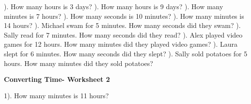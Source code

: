 \documentclass{article}%
\begin{document}
). How many hours is 3 days?%
\newline%
\newline%
). How many hours is 9 days?%
\newline%
\newline%
). How many minutes is 7 hours?%
\newline%
\newline%
). How many seconds is 10 minutes?%
\newline%
\newline%
). How many minutes is 14 hours?%
\newline%
\newline%
). Michael swam for 5 minutes. How many seconds did they swam?%
\newline%
\newline%
). Sally read for 7 minutes. How many seconds did they read?%
\newline%
\newline%
). Alex played video games for 12 hours. How many minutes did they played video games?%
\newline%
\newline%
). Laura slept for 6 minutes. How many seconds did they slept?%
\newline%
\newline%
). Sally sold potatoes for 5 hours. How many minutes did they sold potatoes?%
\newline%
\newline%
\newline%
\pagebreak%
\large%
\begin{center}%
\textbf{Converting Time- Worksheet 2}%
\newline%
\newline%
\newline%
\end{center} \normalsize%
1). How many minutes is 11 hours?%
\newline%
\newline%
\newline%
\end{document}
